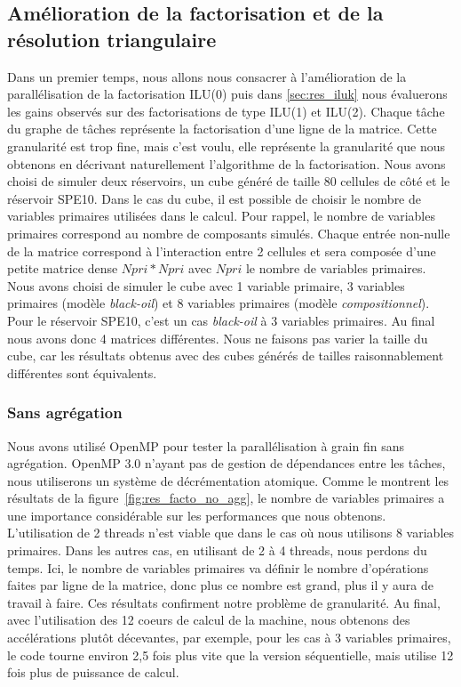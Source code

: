 \subsection{Amélioration de la factorisation et de la résolution triangulaire}
Dans un premier temps, nous allons nous consacrer à l'amélioration de la parallélisation de la factorisation ILU(0) puis dans \ref{sec:res_iluk} nous évaluerons les gains observés sur des factorisations de type ILU(1) et ILU(2).
%
Chaque tâche du graphe de tâches représente la factorisation d'une ligne de la matrice.
%
Cette granularité est trop fine, mais c'est voulu, elle représente la granularité que nous obtenons en décrivant naturellement l'algorithme de la factorisation.
%
Nous avons choisi de simuler deux réservoirs, un cube généré de taille 80 cellules de côté et le réservoir SPE10.
%
Dans le cas du cube, il est possible de choisir le nombre de variables primaires utilisées dans le calcul.
%
Pour rappel, le nombre de variables primaires correspond au nombre de composants simulés.
%
Chaque entrée non-nulle de la matrice correspond à l'interaction entre 2 cellules et sera composée d'une petite matrice dense $Npri*Npri$ avec $Npri$ le nombre de variables primaires.
%
Nous avons choisi de simuler le cube avec 1 variable primaire, 3 variables primaires (modèle {\em black-oil}) et 8 variables primaires (modèle {\em compositionnel}).
%
Pour le réservoir SPE10, c'est un cas {\em black-oil} à 3 variables primaires.
%
Au final nous avons donc 4 matrices différentes.
%
Nous ne faisons pas varier la taille du cube, car les résultats obtenus avec des cubes générés de tailles raisonnablement différentes sont équivalents.

\subsubsection{Sans agrégation}
Nous avons utilisé OpenMP pour tester la parallélisation à grain fin sans agrégation.
%
OpenMP 3.0 n'ayant pas de gestion de dépendances entre les tâches, nous utiliserons un système de décrémentation atomique.
%
Comme le montrent les résultats de la figure~\ref{fig:res_facto_no_agg}, le nombre de variables primaires a une importance considérable sur les performances que nous obtenons.
%
L'utilisation de 2 threads n'est viable que dans le cas où nous utilisons 8 variables primaires.
%
Dans les autres cas, en utilisant de 2 à 4 threads, nous perdons du temps.
%
Ici, le nombre de variables primaires va définir le nombre d'opérations faites par ligne de la matrice, donc plus ce nombre est grand, plus il y aura de travail à faire.
%
Ces résultats confirment notre problème de granularité.
%
Au final, avec l'utilisation des 12 coeurs de calcul de la machine, nous obtenons des accélérations plutôt décevantes, par exemple, pour les cas à 3 variables primaires, le code tourne environ 2,5 fois plus vite que la version séquentielle, mais utilise 12 fois plus de puissance de calcul.

